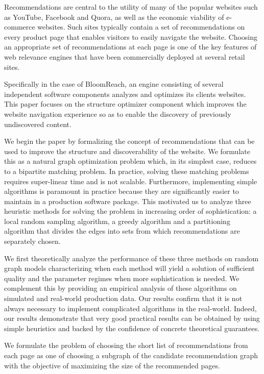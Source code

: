 \abstract

Recommendations are central to the utility of many of the popular websites such as YouTube,
Facebook and Quora, as well as the economic viability of e-commerce websites.
Such sites typically contain a set of recommendations on every product
page that enables visitors to easily navigate the website. Choosing
an appropriate set of recommendations at each page is one of the key
features of web relevance engines that have been commercially deployed 
at several retail sites.

Specifically in the case of BloomReach, an engine consisting of several independent
software components analyzes and optimizes its clients websites.
This paper focuses on the structure optimizer component which
improves the website navigation experience so as to enable the discovery of previously
undiscovered content.

We begin the paper by formalizing the concept of recommendations that can be used to improve
the structure and discoverability of the website. We formulate this as a natural graph optimization
problem which, in its simplest case, reduces to a bipartite matching problem. In practice, solving these
matching problems requires super-linear time and is not scalable. Furthermore, implementing simple 
algorithms is paramount in practice because they are
significantly easier to maintain in a production software package. This motivated us to analyze 
three heuristic methods for solving the problem in increasing order of sophistication: 
a local random sampling algorithm,
a greedy algorithm and a partitioning algorithm that divides the edges into sets from which recommendations
are separately chosen.

We first theoretically analyze the performance of these three methods
on random graph models characterizing when each method will yield a solution of sufficient quality
and the parameter regimes when more sophistication is needed. 
We complement this by providing an empirical analysis
of these algorithms on simulated and real-world production data. Our
results confirm that it is not always necessary to implement complicated
algorithms in the real-world. Indeed, our results demonstrate that 
very good practical results 
can be obtained by using simple heuristics and 
backed by the confidence of concrete theoretical guarantees.

\iffalse

We formulate the problem of choosing the short list of recommendations from each page as one of choosing a subgraph of the candidate recommendation graph with the objective of maximizing the size of the recommended pages.

